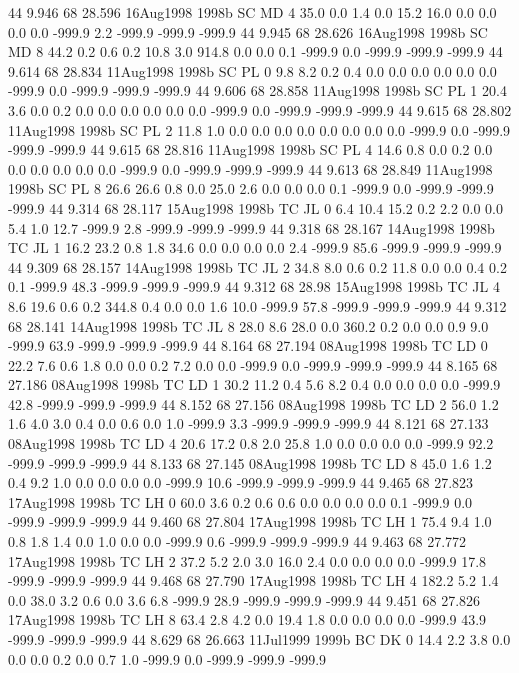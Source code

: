 44 9.946	68 28.596	16Aug1998	1998b	SC	MD	4	35.0	0.0	1.4	0.0	15.2	16.0	0.0	0.0	0.0	0.0	-999.9	2.2	-999.9	-999.9	-999.9
44 9.945	68 28.626	16Aug1998	1998b	SC	MD	8	44.2	0.2	0.6	0.2	10.8	3.0	914.8	0.0	0.0	0.1	-999.9	0.0	-999.9	-999.9	-999.9
44 9.614	68 28.834	11Aug1998	1998b	SC	PL	0	9.8	8.2	0.2	0.4	0.0	0.0	0.0	0.0	0.0	0.0	-999.9	0.0	-999.9	-999.9	-999.9
44 9.606	68 28.858	11Aug1998	1998b	SC	PL	1	20.4	3.6	0.0	0.2	0.0	0.0	0.0	0.0	0.0	0.0	-999.9	0.0	-999.9	-999.9	-999.9
44 9.615	68 28.802	11Aug1998	1998b	SC	PL	2	11.8	1.0	0.0	0.0	0.0	0.0	0.0	0.0	0.0	0.0	-999.9	0.0	-999.9	-999.9	-999.9
44 9.615	68 28.816	11Aug1998	1998b	SC	PL	4	14.6	0.8	0.0	0.2	0.0	0.0	0.0	0.0	0.0	0.0	-999.9	0.0	-999.9	-999.9	-999.9
44 9.613	68 28.849	11Aug1998	1998b	SC	PL	8	26.6	26.6	0.8	0.0	25.0	2.6	0.0	0.0	0.0	0.1	-999.9	0.0	-999.9	-999.9	-999.9
44 9.314	68 28.117	15Aug1998	1998b	TC	JL	0	6.4	10.4	15.2	0.2	2.2	0.0	0.0	5.4	1.0	12.7	-999.9	2.8	-999.9	-999.9	-999.9
44 9.318	68 28.167	14Aug1998	1998b	TC	JL	1	16.2	23.2	0.8	1.8	34.6	0.0	0.0	0.0	0.0	2.4	-999.9	85.6	-999.9	-999.9	-999.9
44 9.309	68 28.157	14Aug1998	1998b	TC	JL	2	34.8	8.0	0.6	0.2	11.8	0.0	0.0	0.4	0.2	0.1	-999.9	48.3	-999.9	-999.9	-999.9
44 9.312	68 28.98	15Aug1998	1998b	TC	JL	4	8.6	19.6	0.6	0.2	344.8	0.4	0.0	0.0	1.6	10.0	-999.9	57.8	-999.9	-999.9	-999.9
44 9.312	68 28.141	14Aug1998	1998b	TC	JL	8	28.0	8.6	28.0	0.0	360.2	0.2	0.0	0.0	0.9	9.0	-999.9	63.9	-999.9	-999.9	-999.9
44 8.164	68 27.194	08Aug1998	1998b	TC	LD	0	22.2	7.6	0.6	1.8	0.0	0.0	0.2	7.2	0.0	0.0	-999.9	0.0	-999.9	-999.9	-999.9
44 8.165	68 27.186	08Aug1998	1998b	TC	LD	1	30.2	11.2	0.4	5.6	8.2	0.4	0.0	0.0	0.0	0.0	-999.9	42.8	-999.9	-999.9	-999.9
44 8.152	68 27.156	08Aug1998	1998b	TC	LD	2	56.0	1.2	1.6	4.0	3.0	0.4	0.0	0.6	0.0	1.0	-999.9	3.3	-999.9	-999.9	-999.9
44 8.121	68 27.133	08Aug1998	1998b	TC	LD	4	20.6	17.2	0.8	2.0	25.8	1.0	0.0	0.0	0.0	0.0	-999.9	92.2	-999.9	-999.9	-999.9
44 8.133	68 27.145	08Aug1998	1998b	TC	LD	8	45.0	1.6	1.2	0.4	9.2	1.0	0.0	0.0	0.0	0.0	-999.9	10.6	-999.9	-999.9	-999.9
44 9.465	68 27.823	17Aug1998	1998b	TC	LH	0	60.0	3.6	0.2	0.6	0.6	0.0	0.0	0.0	0.0	0.1	-999.9	0.0	-999.9	-999.9	-999.9
44 9.460	68 27.804	17Aug1998	1998b	TC	LH	1	75.4	9.4	1.0	0.8	1.8	1.4	0.0	1.0	0.0	0.0	-999.9	0.6	-999.9	-999.9	-999.9
44 9.463	68 27.772	17Aug1998	1998b	TC	LH	2	37.2	5.2	2.0	3.0	16.0	2.4	0.0	0.0	0.0	0.0	-999.9	17.8	-999.9	-999.9	-999.9
44 9.468	68 27.790	17Aug1998	1998b	TC	LH	4	182.2	5.2	1.4	0.0	38.0	3.2	0.6	0.0	3.6	6.8	-999.9	28.9	-999.9	-999.9	-999.9
44 9.451	68 27.826	17Aug1998	1998b	TC	LH	8	63.4	2.8	4.2	0.0	19.4	1.8	0.0	0.0	0.0	0.0	-999.9	43.9	-999.9	-999.9	-999.9
44 8.629	68 26.663	11Jul1999	1999b	BC	DK	0	14.4	2.2	3.8	0.0	0.0	0.0	0.2	0.0	0.7	1.0	-999.9	0.0	-999.9	-999.9	-999.9
